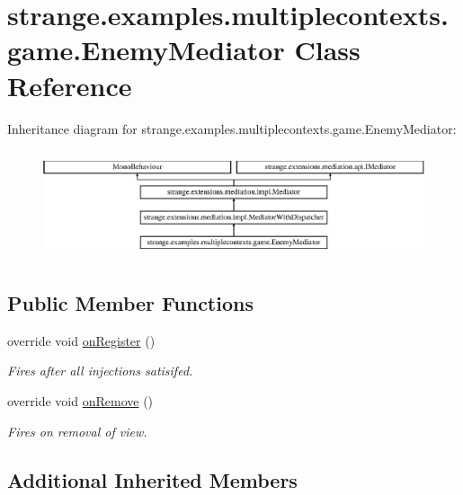 \hypertarget{classstrange_1_1examples_1_1multiplecontexts_1_1game_1_1_enemy_mediator}{\section{strange.\-examples.\-multiplecontexts.\-game.\-Enemy\-Mediator Class Reference}
\label{classstrange_1_1examples_1_1multiplecontexts_1_1game_1_1_enemy_mediator}
}
Inheritance diagram for strange.\-examples.\-multiplecontexts.\-game.\-Enemy\-Mediator\-:\begin{figure}[H]
\begin{center}
\leavevmode
\includegraphics[height=3.227666cm]{classstrange_1_1examples_1_1multiplecontexts_1_1game_1_1_enemy_mediator}
\end{center}
\end{figure}
\subsection*{Public Member Functions}
\begin{DoxyCompactItemize}
\item 
override void \hyperlink{classstrange_1_1examples_1_1multiplecontexts_1_1game_1_1_enemy_mediator_aa38c745cbfae259c953fe69858c2c163}{on\-Register} ()
\begin{DoxyCompactList}\small\item\em Fires after all injections satisifed. \end{DoxyCompactList}\item 
override void \hyperlink{classstrange_1_1examples_1_1multiplecontexts_1_1game_1_1_enemy_mediator_af713d15b87acf58180aaba234fe43c82}{on\-Remove} ()
\begin{DoxyCompactList}\small\item\em Fires on removal of view. \end{DoxyCompactList}\end{DoxyCompactItemize}
\subsection*{Additional Inherited Members}


